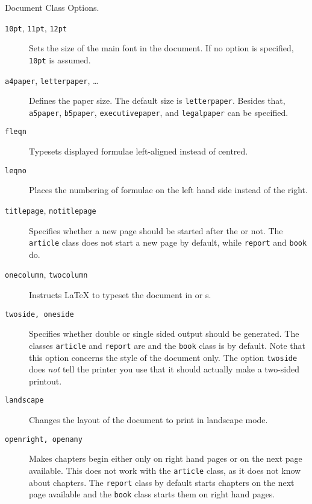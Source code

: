 \begin{table}[!bp]
\caption{Document Class Options.} \label{options}
\begin{lined}{\textwidth}
\begin{flushleft}
\begin{description}
\item[\normalfont\texttt{10pt}, \texttt{11pt}, \texttt{12pt}] \quad Sets the size
  of the main font in the document. If no option is specified,
  \texttt{10pt} is assumed.  
\item[\normalfont\texttt{a4paper}, \texttt{letterpaper}, \ldots] \quad Defines
  the paper size. The default size is \texttt{letterpaper}. Besides
  that, \texttt{a5paper}, \texttt{b5paper}, \texttt{executivepaper},
  and \texttt{legalpaper} can be specified.  
   

\item[\normalfont\texttt{fleqn}] \quad Typesets displayed formulae left-aligned
  instead of centred.

\item[\normalfont\texttt{leqno}] \quad Places the numbering of formulae on the
  left hand side instead of the right.

\item[\normalfont\texttt{titlepage}, \texttt{notitlepage}] \quad Specifies
  whether a new page should be started after the 
  or not. The \texttt{article} class does not start a new page by
  default, while \texttt{report} and \texttt{book} do.  

\item[\normalfont\texttt{onecolumn}, \texttt{twocolumn}] \quad Instructs \LaTeX{} to typeset the
  document in  or s.

\item[\normalfont\texttt{twoside, oneside}] \quad Specifies whether double or
  single sided output should be generated. The classes
  \texttt{article} and \texttt{report} are  and the
  \texttt{book} class is  by default. Note that this
  option concerns the style of the document only. The option
  \texttt{twoside} does \emph{not} tell the printer you use that it
  should actually make a two-sided printout.
\item[\normalfont\texttt{landscape}] \quad Changes the layout of the document to print in landscape mode.
\item[\normalfont\texttt{openright, openany}] \quad Makes chapters begin either
  only on right hand pages or on the next page available. This does
  not work with the \texttt{article} class, as it does not know about
  chapters. The \texttt{report} class by default starts chapters on
  the next page available and the \texttt{book} class starts them on
  right hand pages.

\end{description}
\end{flushleft}
\end{lined}
\end{table}

